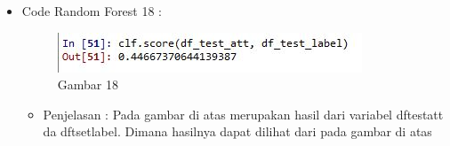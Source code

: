 \begin{enumerate}
\begin{itemize}
\begin{itemize}
\par
\end{itemize}
\item Code Random Forest 18 :
\par
\begin{figure}[ht]
\centering
\includegraphics[scale=0.7]{figures/AFS/4r.jpg}
\caption{Gambar 18}
\label{contoh}
\end{figure}
\par
\begin{itemize}
\item Penjelasan : Pada gambar di atas merupakan hasil dari variabel dftestatt da dftsetlabel. Dimana hasilnya dapat dilihat dari pada gambar di atas
\par
\par
\end{itemize}

\end{itemize}


\end{enumerate}
